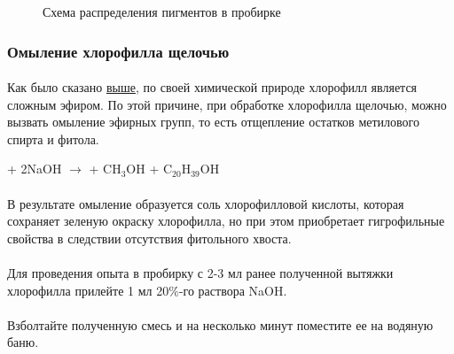 \begin{figure}[h!]
\label{pigments_separation}
\caption{Схема распределения пигментов в пробирке}
\end{figure}

\subsubsection*{Омыление хлорофилла щелочью}

\paragraph*{}Как было сказано \hyperlink{chlorophilus_eterus}{выше}, по своей химической природе хлорофилл является сложным эфиром. По этой причине,  при обработке хлорофилла щелочью, можно вызвать омыление эфирных групп, то есть отщепление остатков метилового спирта и фитола.

 + 2NaOH $\rightarrow$  +  CH$_{3}$OH + C$_{20}$H$_{39}$OH


\paragraph*{}В результате омыление образуется соль хлорофилловой кислоты, которая сохраняет зеленую окраску хлорофилла, но при этом приобретает гигрофильные свойства в следствии  отсутствия фитольного хвоста.  

\paragraph*{}Для проведения опыта в пробирку с 2-3 мл ранее полученной вытяжки хлорофилла прилейте 1 мл 20\%-го раствора NaOH.

\paragraph*{}Взболтайте полученную смесь и на несколько минут поместите ее на водяную баню.

